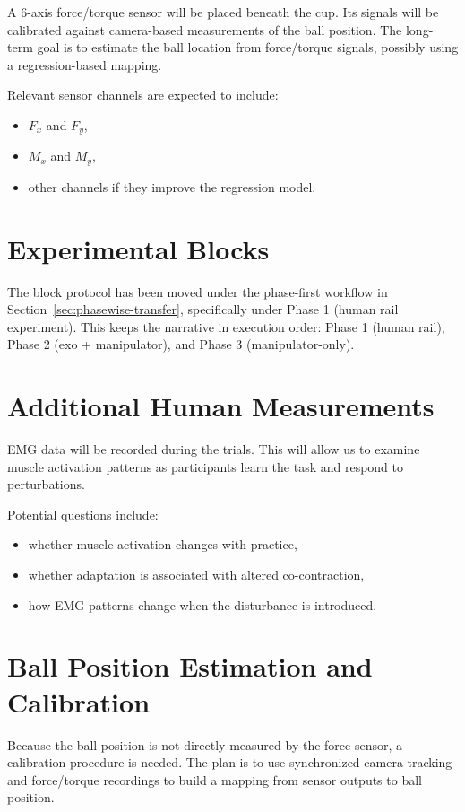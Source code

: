 \documentclass[11pt, a4paper]{article}
\begin{document}
A 6-axis force/torque sensor will be placed beneath the cup. Its signals will be calibrated against camera-based measurements of the ball position. The long-term goal is to estimate the ball location from force/torque signals, possibly using a regression-based mapping.

Relevant sensor channels are expected to include:

\begin{itemize}[nosep]
  \item $F_x$ and $F_y$,
  \item $M_x$ and $M_y$,
  \item other channels if they improve the regression model.
\end{itemize}

\section{Experimental Blocks}

The block protocol has been moved under the phase-first workflow in
Section~\ref{sec:phasewise-transfer}, specifically under
Phase 1 (human rail experiment). This keeps the narrative in execution order:
Phase 1 (human rail), Phase 2 (exo + manipulator), and Phase 3 (manipulator-only).

\section{Additional Human Measurements}

EMG data will be recorded during the trials. This will allow us to examine muscle activation patterns as participants learn the task and respond to perturbations.

Potential questions include:

\begin{itemize}[nosep]
  \item whether muscle activation changes with practice,
  \item whether adaptation is associated with altered co-contraction,
  \item how EMG patterns change when the disturbance is introduced.
\end{itemize}

\section{Ball Position Estimation and Calibration}

Because the ball position is not directly measured by the force sensor, a calibration procedure is needed. The plan is to use synchronized camera tracking and force/torque recordings to build a mapping from sensor outputs to ball position.
\end{document}
